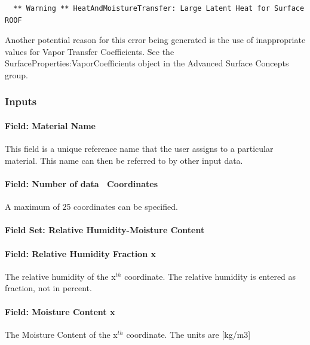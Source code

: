 \begin{lstlisting}
  ** Warning ** HeatAndMoistureTransfer: Large Latent Heat for Surface ROOF
\end{lstlisting}

Another potential reason for this error being generated is the use of inappropriate values for Vapor Transfer Coefficients. See the SurfaceProperties:VaporCoefficients object in the Advanced Surface Concepts group.

\subsubsection{Inputs}\label{inputs-8-024}

\paragraph{Field: Material Name}\label{field-material-name-1}

This field is a unique reference name that the user assigns to a particular material. This name can then be referred to by other input data.

\paragraph{Field: Number of data ~Coordinates}\label{field-number-of-data-coordinates}

A maximum of 25 coordinates can be specified.

\paragraph{Field Set: Relative Humidity-Moisture Content}\label{field-set-relative-humidity-moisture-content}

\paragraph{Field: Relative Humidity Fraction x}\label{field-relative-humidity-fraction-x}

The relative humidity of the x\(^{th}\) coordinate. The relative humidity is entered as fraction, not in percent.

\paragraph{Field: Moisture Content x}\label{field-moisture-content-x}

The Moisture Content of the x\(^{th}\) coordinate. The units are {[}kg/m3{]}

